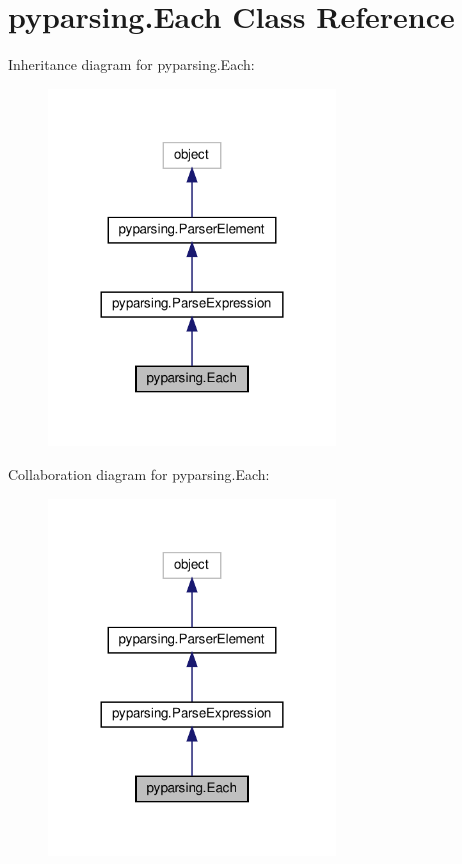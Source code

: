 \hypertarget{classpyparsing_1_1Each}{}\section{pyparsing.\+Each Class Reference}
\label{classpyparsing_1_1Each}


Inheritance diagram for pyparsing.\+Each\+:
\nopagebreak
\begin{figure}[H]
\begin{center}
\leavevmode
\includegraphics[width=216pt]{classpyparsing_1_1Each__inherit__graph}
\end{center}
\end{figure}


Collaboration diagram for pyparsing.\+Each\+:
\nopagebreak
\begin{figure}[H]
\begin{center}
\leavevmode
\includegraphics[width=216pt]{classpyparsing_1_1Each__coll__graph}
\end{center}
\end{figure}
